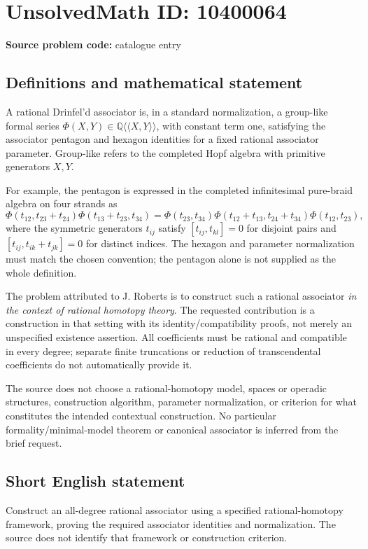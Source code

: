 \documentclass[11pt]{article}
\newcommand{\Q}{\mathbb{Q}}
\begin{document}
\section*{UnsolvedMath ID: 10400064}
\textbf{Source problem code:} catalogue entry
\subsection{Definitions and mathematical statement}
A rational Drinfel'd associator is, in a standard normalization, a group-like formal series $\Phi(X,Y)\in\Q\langle\langle X,Y\rangle\rangle$, with constant term one, satisfying the associator pentagon and hexagon identities for a fixed rational associator parameter. Group-like refers to the completed Hopf algebra with primitive generators $X,Y$.

For example, the pentagon is expressed in the completed infinitesimal pure-braid algebra on four strands as
\[
\Phi(t_{12},t_{23}+t_{24})\Phi(t_{13}+t_{23},t_{34})
=\Phi(t_{23},t_{34})\Phi(t_{12}+t_{13},t_{24}+t_{34})\Phi(t_{12},t_{23}),
\]
where the symmetric generators $t_{ij}$ satisfy $[t_{ij},t_{kl}]=0$ for disjoint pairs and $[t_{ij},t_{ik}+t_{jk}]=0$ for distinct indices. The hexagon and parameter normalization must match the chosen convention; the pentagon alone is not supplied as the whole definition.

The problem attributed to J. Roberts is to construct such a rational associator \emph{in the context of rational homotopy theory}. The requested contribution is a construction in that setting with its identity/compatibility proofs, not merely an unspecified existence assertion. All coefficients must be rational and compatible in every degree; separate finite truncations or reduction of transcendental coefficients do not automatically provide it.

The source does not choose a rational-homotopy model, spaces or operadic structures, construction algorithm, parameter normalization, or criterion for what constitutes the intended contextual construction. No particular formality/minimal-model theorem or canonical associator is inferred from the brief request.
\subsection{Short English statement}
Construct an all-degree rational associator using a specified rational-homotopy framework, proving the required associator identities and normalization. The source does not identify that framework or construction criterion.
\end{document}
